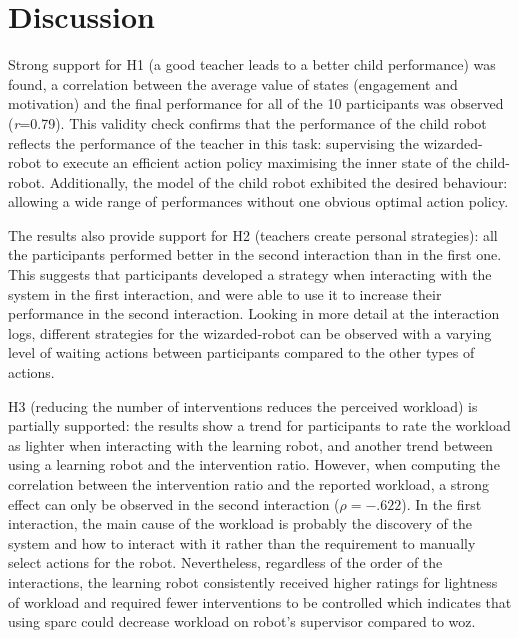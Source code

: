 
\section{Discussion}

Strong support for H1 (a good teacher leads to a better child performance) was found, a correlation between the average value of states (engagement and motivation) and the final performance for all of the 10 participants was observed (\textit{r}=0.79). This validity check confirms that the performance of the child robot reflects the performance of the teacher in this task: supervising the wizarded-robot to execute an efficient action policy maximising the inner state of the child-robot. Additionally, the model of the child robot exhibited the desired behaviour: allowing a wide range of performances without one obvious optimal action policy.

The results also provide support for H2 (teachers create personal strategies): all the participants performed better in the second interaction than in the first one. This suggests that participants developed a strategy when interacting with the system in the first interaction, and were able to use it to increase their performance in the second interaction. Looking in more detail at the interaction logs, different strategies for the wizarded-robot can be observed with a varying level of waiting actions between participants compared to the other types of actions.

H3 (reducing the number of interventions reduces the perceived workload) is partially supported: the results show a trend for participants to rate the workload as lighter when interacting with the learning robot, and another trend between using a learning robot and the intervention ratio. However, when computing the correlation between the intervention ratio and the reported workload, a strong effect can only be observed in the second interaction ($\rho = -.622$). In the first interaction, the main cause of the workload is probably the discovery of the system and how to interact with it rather than the requirement to manually select actions for the robot. Nevertheless, regardless of the order of the interactions, the learning robot consistently received higher ratings for lightness of workload and required fewer interventions to be controlled which indicates that using \gls{sparc} could decrease workload on robot's supervisor compared to \gls{woz}.


